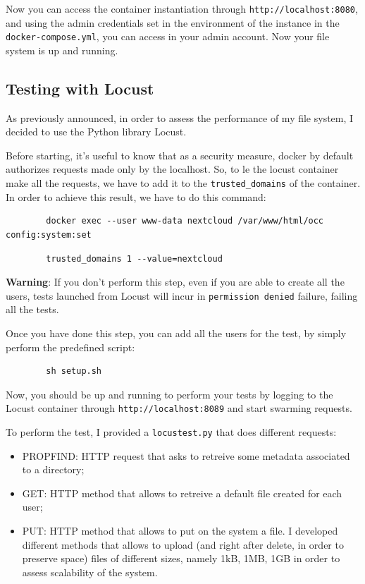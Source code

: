 \documentclass{article}
\begin{document}
	Now you can access the container instantiation through \verb|http://localhost:8080|, and using the admin credentials set in the environment of the instance in the \verb|docker-compose.yml|, you can access in your admin account.
	Now your file system is up and running.
	
	\subsection{Testing with Locust}
	As previously announced, in order to assess the performance of my file system, I decided to use the Python library Locust.
	
	Before starting, it's useful to know that as a security measure, docker by default authorizes requests made only by the localhost. So, to le the locust container make all the requests, we have to add it to the \verb|trusted_domains| of the container. In order to achieve this result, we have to do this command:
	\begin{verbatim}
		docker exec --user www-data nextcloud /var/www/html/occ config:system:set
	\end{verbatim}
	\begin{verbatim}
		trusted_domains 1 --value=nextcloud
	\end{verbatim}
	
	\textbf{Warning}: If you don't perform this step, even if you are able to create all the users, tests launched from Locust will incur in \verb|permission denied| failure, failing all the tests.
	
	Once you have done this step, you can add all the users for the test, by simply perform the predefined script:
	\begin{verbatim}
		sh setup.sh
	\end{verbatim}
		
	Now, you should be up and running to perform your tests by logging to the Locust container through \verb|http://localhost:8089| and start swarming requests.
	
	To perform the test, I provided a \verb|locustest.py| that does different requests:
	\begin{itemize}
		\item PROPFIND: HTTP request that asks to retreive some metadata associated to a directory;
		\item GET: HTTP method that allows to retreive a default file created for each user;
		\item PUT: HTTP method that allows to put on the system a file. I developed 
		different methods that allows to upload (and right after delete, in order to preserve space) files of different sizes, namely 1kB, 1MB, 1GB in order to assess scalability of the system.
	\end{itemize}
\end{document}
